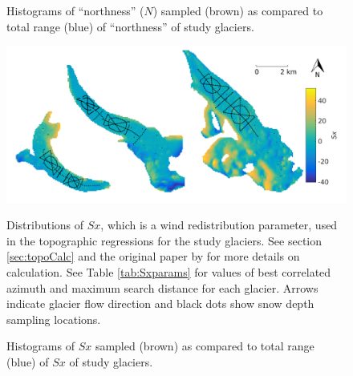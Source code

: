 \documentclass[12pt]{article}
\newcommand{\topomap}{Arrows indicate glacier flow direction and black dots show snow depth sampling locations.}
\begin{document}
\begin{figure}[H]
	\caption{Histograms of ``northness'' ($N$) sampled (brown) as compared to total range (blue) of ``northness'' of study glaciers.}
	\label{sampledRange:northness}
\end{figure}

\begin{figure}[H]
	\centering
	\includegraphics[width=\textwidth]{Map_Sx.png}\\
	\caption{Distributions of $Sx$, which is a wind redistribution parameter, used in the topographic regressions for the study glaciers. See section \ref{sec:topoCalc} and the original paper by \cite{Winstral2002} for more details on calculation. See Table \ref{tab:Sxparams} for values of best correlated azimuth and maximum search distance for each glacier. \topomap}
	\label{map:Sx}
\end{figure}

\begin{figure}[H]
	\caption{Histograms of $Sx$ sampled (brown) as compared to total range (blue) of $Sx$ of study glaciers.}
	\label{sampledRange:Sx}
\end{figure}
\end{document}
